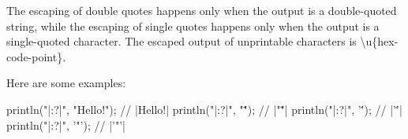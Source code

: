 The escaping of double quotes happens only when the output is a double-quoted string, while the escaping of single quotes happens only when the output is a single-quoted character. The escaped output of unprintable characters is \textbackslash{}u\{hex-code-point\}.

Here are some examples:

\begin{cpp}
println("|{:?}|", "Hello\tWorld!\n");   // |Hello\tWorld!\n|
println("|{:?}|", "\"");                // |"\""|
println("|{:?}|", '\'');                // |'\''|
println("|{:?}|", '"');                 // |'"'|
\end{cpp}








